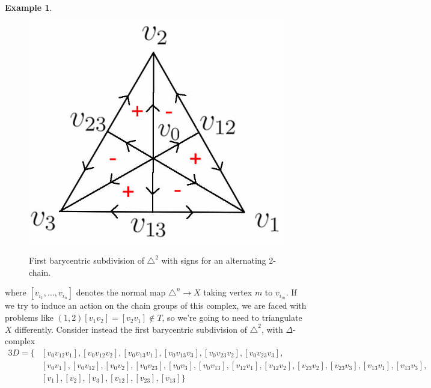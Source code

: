 \documentclass[11pt,a4paper,twoside]{article}
\theoremstyle{plain}
\theoremstyle{definition}
\theoremstyle{definition}
\theoremstyle{definition}
\theoremstyle{definition}
\newtheorem{example}[thm]{Example}
\theoremstyle{definition}
\begin{document}
\begin{example}
\begin{figure}
\begin{minipage}{.47\textwidth}
\end{minipage}%
\hfill
\begin{minipage}{.47\textwidth}
  \centering
\includegraphics[scale=0.2]{Images/BarySub2Simplex.jpg}
\label{BarySub2Simplex}
\caption{First barycentric subdivision of $\triangle^2$ with signs for an alternating 2-chain.}

\end{minipage}
\end{figure}
where $[v_{i_1},\dots,v_{i_n}]$ denotes the normal map $\triangle^n\longrightarrow X$ taking vertex $m$ to $v_{i_m}$.
If we try to induce an action on the chain groups of this complex, we are faced with problems like $(1,2)[v_1 v_2]=[v_2 v_1]\notin T$, so we're going to need to triangulate $X$ differently. Consider instead the first barycentric subdivision of $\triangle^2$, with $\Delta$-complex
\begin{alignat*}{3}
D =\{ & [v_0 v_{12} v_1],[v_0 v_{12} v_2],[v_0 v_{13} v_1],[v_0 v_{13} v_3],[v_0 v_{23} v_2],[v_0 v_{23} v_3],\\
& [v_0 v_1],[v_0 v_{12}],[v_0 v_2],[v_0 v_{23}],[v_0 v_3],[v_0 v_{13}],[v_{12} v_1],[v_{12} v_2],[v_{23} v_2],[v_{23} v_3],[v_{13} v_1],[v_{13} v_3],\\
&[v_1],[v_2],[v_3],[v_{12}],[v_{23}],[v_{13}]\}
\end{alignat*}


\end{example}
\end{document}
